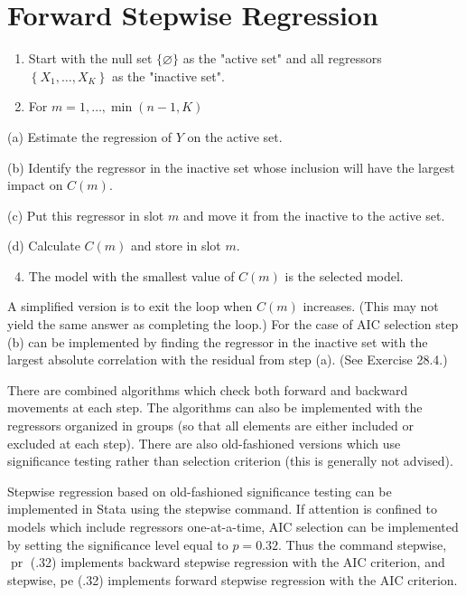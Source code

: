 \documentclass[10pt]{article}
\begin{document}
\section{Forward Stepwise Regression}
\begin{enumerate}
  \item Start with the null set $\{\varnothing\}$ as the "active set" and all regressors $\left\{X_{1}, \ldots, X_{K}\right\}$ as the "inactive set".

  \item For $m=1, \ldots, \min (n-1, K)$

\end{enumerate}
(a) Estimate the regression of $Y$ on the active set.

(b) Identify the regressor in the inactive set whose inclusion will have the largest impact on $C(m)$.

(c) Put this regressor in slot $m$ and move it from the inactive to the active set.

(d) Calculate $C(m)$ and store in slot $m$.

\begin{enumerate}
  \setcounter{enumi}{3}
  \item The model with the smallest value of $C(m)$ is the selected model.
\end{enumerate}
A simplified version is to exit the loop when $C(m)$ increases. (This may not yield the same answer as completing the loop.) For the case of AIC selection step (b) can be implemented by finding the regressor in the inactive set with the largest absolute correlation with the residual from step (a). (See Exercise 28.4.)

There are combined algorithms which check both forward and backward movements at each step. The algorithms can also be implemented with the regressors organized in groups (so that all elements are either included or excluded at each step). There are also old-fashioned versions which use significance testing rather than selection criterion (this is generally not advised).

Stepwise regression based on old-fashioned significance testing can be implemented in Stata using the stepwise command. If attention is confined to models which include regressors one-at-a-time, AIC selection can be implemented by setting the significance level equal to $p=0.32$. Thus the command stepwise, $\operatorname{pr}$ (.32) implements backward stepwise regression with the AIC criterion, and stepwise, pe (.32) implements forward stepwise regression with the AIC criterion.
\end{document}
